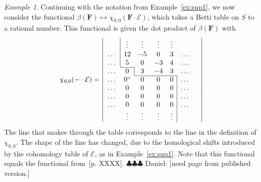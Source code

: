 \documentclass[12pt]{amsart}
\theoremstyle{definition}
\theoremstyle{remark}
\newtheorem{example}[lemma]{Example}
\newcommand{\cE}{\mathcal{E}}
\newcommand{\FF}{\mathbf{F}}
\newcommand{\zp}{\circ}
\newcommand{\daniel}[1]{{\color{green} \sf $\clubsuit\clubsuit\clubsuit$ Daniel: [#1]}}
\begin{document}
\begin{example}\label{ex:sup2}
Continuing with the notation from Example~\ref{ex:sup1}, we now consider the functional $\beta(\FF)\mapsto \chi_{0,0}(\FF\cdot \cE)$, which takes a Betti table on $S$ to a rational number.  This functional is given the dot product of $\beta(\FF)$ with
\[
\chi_{0,0}(-\cdot \cE)=
\left|
\begin{array}{ccccccc}
&\multicolumn{1}{|c}{\vdots}&\vdots&\vdots&\vdots&&\\
\dots&\multicolumn{1}{|c}{12}&-5&0&3&\dots\\
\dots&\multicolumn{1}{|c}{5}&0&-3&4&\dots\\ \cline{2-2}
\dots&{0}&\multicolumn{1}{|c}{3}&-4&3&\dots\\ \cline{3-5}
\dots&0^\zp&0&0&{0}&\multicolumn{1}{|c}{\dots}\\
\dots&0&0&0&0&\multicolumn{1}{|c}{\dots}\\
\dots&0&0&0&0&\multicolumn{1}{|c}{\dots}\\
\dots&0&0&0&0&\multicolumn{1}{|c}{\dots}\\
&\vdots&\vdots&\vdots&\vdots&\multicolumn{1}{|c}{}&\\
\end{array}
\right|
\]
The line that snakes through the table corresponds to the line in the definition of $\chi_{0,0}$. The shape of the line has changed, due to the homological shifts introduced by the cohomology table of $\cE$, as in Example~\ref{ex:sup1}.  Note that this functional equals the functional from~[p. XXXX]\cite{eis-schrey-icm}. \daniel{need page from published version.}
\end{example}
\end{document}
